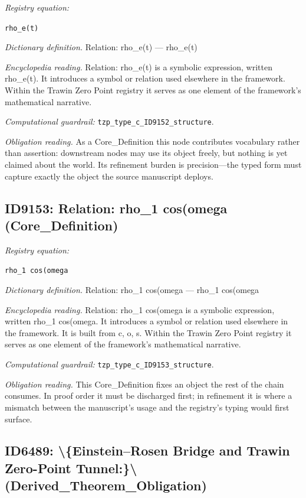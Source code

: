 \documentclass[11pt]{article}
\theoremstyle{remark}
\begin{document}
\noindent\textit{Registry equation:}\par
{\small\texttt{rho\_e(t)}}\par\medskip
\noindent\textit{Dictionary definition.} Relation: rho\_e(t) --- rho\_e(t)\par\medskip
\noindent\textit{Encyclopedia reading.} Relation: rho\_e(t) is a symbolic expression, written rho\_e(t). It introduces a symbol or relation used elsewhere in the framework. Within the Trawin Zero Point registry it serves as one element of the framework's mathematical narrative.
\par\medskip\noindent\textit{Computational guardrail:} \texttt{tzp\_type\_c\_ID9152\_structure}.
\par\medskip\noindent\textit{Obligation reading.} As a Core\_Definition this node contributes vocabulary rather than assertion: downstream nodes may use its object freely, but nothing is yet claimed about the world. Its refinement burden is precision---the typed form must capture exactly the object the source manuscript deploys.

\subsection{ID9153: Relation: rho\_1 cos(omega (Core\_Definition)}

\noindent\textit{Registry equation:}\par
{\small\texttt{rho\_1 cos(omega}}\par\medskip
\noindent\textit{Dictionary definition.} Relation: rho\_1 cos(omega --- rho\_1 cos(omega\par\medskip
\noindent\textit{Encyclopedia reading.} Relation: rho\_1 cos(omega is a symbolic expression, written rho\_1 cos(omega. It introduces a symbol or relation used elsewhere in the framework. It is built from c, o, s. Within the Trawin Zero Point registry it serves as one element of the framework's mathematical narrative.
\par\medskip\noindent\textit{Computational guardrail:} \texttt{tzp\_type\_c\_ID9153\_structure}.
\par\medskip\noindent\textit{Obligation reading.} This Core\_Definition fixes an object the rest of the chain consumes. In proof order it must be discharged first; in refinement it is where a mismatch between the manuscript's usage and the registry's typing would first surface.

\subsection{ID6489: \textbackslash{}\{Einstein--Rosen Bridge and Trawin Zero-Point Tunnel:\}\textbackslash{} (Derived\_Theorem\_Obligation)}
\end{document}
